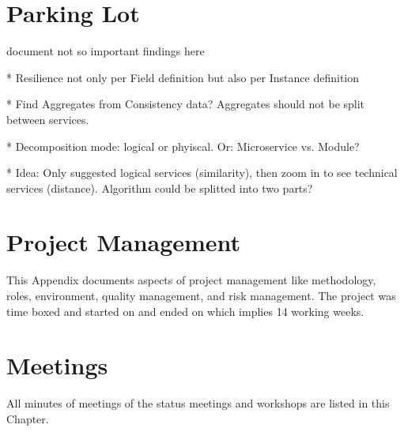 \documentclass[hsr-ba,english]{hgbthesis}
\begin{document}
\chapter{Parking Lot}
document not so important findings here	

* Resilience not only per Field definition but also per Instance definition 

* Find Aggregates from Consistency data? Aggregates should not be split between services.

* Decomposition mode: logical or phyiscal. Or: Microservice vs. Module?

* Idea: Only suggested logical services (similarity), then zoom in to see technical services (distance). Algorithm could be splitted into two parts?




\chapter{Project Management}
\label{cha:projectmgmt}

This Appendix documents aspects of project management like methodology, roles, environment, quality management, and risk management. The project was time boxed and started on  and ended on  which implies 14 working weeks. 






\chapter{Meetings}

All minutes of meetings of the status meetings and workshops are listed in this Chapter.






%
%



\printglossaries


\MakeBibliography
\end{document}
